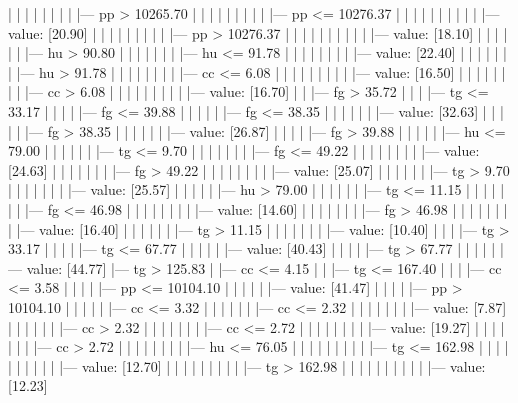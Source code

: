 \documentclass[UTF8, a4paper]{ctexart}
\begin{document}
|   |   |   |   |   |   |   |   |--- pp >  10265.70
|   |   |   |   |   |   |   |   |   |--- pp <= 10276.37
|   |   |   |   |   |   |   |   |   |   |--- value: [20.90]
|   |   |   |   |   |   |   |   |   |--- pp >  10276.37
|   |   |   |   |   |   |   |   |   |   |--- value: [18.10]
|   |   |   |   |   |   |--- hu >  90.80
|   |   |   |   |   |   |   |--- hu <= 91.78
|   |   |   |   |   |   |   |   |--- value: [22.40]
|   |   |   |   |   |   |   |--- hu >  91.78
|   |   |   |   |   |   |   |   |--- cc <= 6.08
|   |   |   |   |   |   |   |   |   |--- value: [16.50]
|   |   |   |   |   |   |   |   |--- cc >  6.08
|   |   |   |   |   |   |   |   |   |--- value: [16.70]
|   |   |--- fg >  35.72
|   |   |   |--- tg <= 33.17
|   |   |   |   |--- fg <= 39.88
|   |   |   |   |   |--- fg <= 38.35
|   |   |   |   |   |   |--- value: [32.63]
|   |   |   |   |   |--- fg >  38.35
|   |   |   |   |   |   |--- value: [26.87]
|   |   |   |   |--- fg >  39.88
|   |   |   |   |   |--- hu <= 79.00
|   |   |   |   |   |   |--- tg <= 9.70
|   |   |   |   |   |   |   |--- fg <= 49.22
|   |   |   |   |   |   |   |   |--- value: [24.63]
|   |   |   |   |   |   |   |--- fg >  49.22
|   |   |   |   |   |   |   |   |--- value: [25.07]
|   |   |   |   |   |   |--- tg >  9.70
|   |   |   |   |   |   |   |--- value: [25.57]
|   |   |   |   |   |--- hu >  79.00
|   |   |   |   |   |   |--- tg <= 11.15
|   |   |   |   |   |   |   |--- fg <= 46.98
|   |   |   |   |   |   |   |   |--- value: [14.60]
|   |   |   |   |   |   |   |--- fg >  46.98
|   |   |   |   |   |   |   |   |--- value: [16.40]
|   |   |   |   |   |   |--- tg >  11.15
|   |   |   |   |   |   |   |--- value: [10.40]
|   |   |   |--- tg >  33.17
|   |   |   |   |--- tg <= 67.77
|   |   |   |   |   |--- value: [40.43]
|   |   |   |   |--- tg >  67.77
|   |   |   |   |   |--- value: [44.77]
|--- tg >  125.83
|   |--- cc <= 4.15
|   |   |--- tg <= 167.40
|   |   |   |--- cc <= 3.58
|   |   |   |   |--- pp <= 10104.10
|   |   |   |   |   |--- value: [41.47]
|   |   |   |   |--- pp >  10104.10
|   |   |   |   |   |--- cc <= 3.32
|   |   |   |   |   |   |--- cc <= 2.32
|   |   |   |   |   |   |   |--- value: [7.87]
|   |   |   |   |   |   |--- cc >  2.32
|   |   |   |   |   |   |   |--- cc <= 2.72
|   |   |   |   |   |   |   |   |--- value: [19.27]
|   |   |   |   |   |   |   |--- cc >  2.72
|   |   |   |   |   |   |   |   |--- hu <= 76.05
|   |   |   |   |   |   |   |   |   |--- tg <= 162.98
|   |   |   |   |   |   |   |   |   |   |--- value: [12.70]
|   |   |   |   |   |   |   |   |   |--- tg >  162.98
|   |   |   |   |   |   |   |   |   |   |--- value: [12.23]
\end{document}
